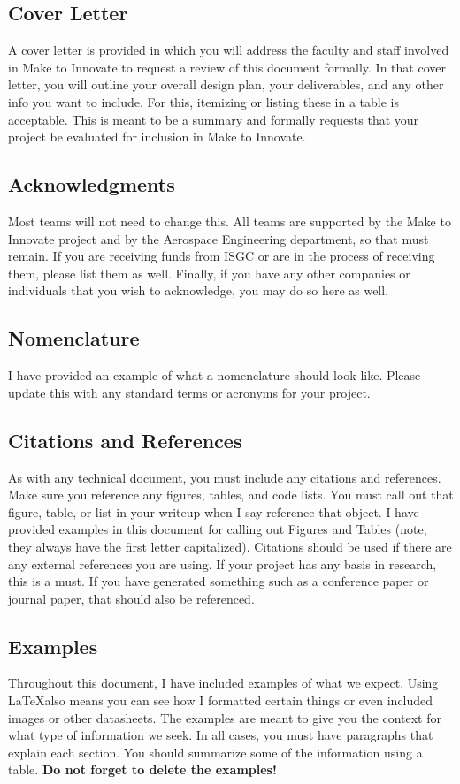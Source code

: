 \subsection{Cover Letter}
A cover letter is provided in which you will address the faculty and staff involved in Make to Innovate to request a review of this document formally. In that cover letter, you will outline your overall design plan, your deliverables, and any other info you want to include. For this, itemizing or listing these in a table is acceptable. This is meant to be a summary and formally requests that your project be evaluated for inclusion in Make to Innovate. 

\subsection{Acknowledgments}
Most teams will not need to change this. All teams are supported by the Make to Innovate project and by the Aerospace Engineering department, so that must remain. If you are receiving funds from ISGC or are in the process of receiving them, please list them as well. Finally, if you have any other companies or individuals that you wish to acknowledge, you may do so here as well.

\subsection{Nomenclature}
I have provided an example of what a nomenclature should look like. Please update this with any standard terms or acronyms for your project. 

\subsection{Citations and References}
As with any technical document, you must include any citations and references. Make sure you reference any figures, tables, and code lists. You must call out that figure, table, or list in your writeup when I say reference that object. I have provided examples in this document for calling out Figures and Tables (note, they always have the first letter capitalized). Citations should be used if there are any external references you are using. If your project has any basis in research, this is a must. If you have generated something such as a conference paper or journal paper, that should also be referenced. 

\subsection{Examples}
Throughout this document, I have included examples of what we expect. Using \LaTeX also means you can see how I formatted certain things or even included images or other datasheets. The examples are meant to give you the context for what type of information we seek. In all cases, you must have paragraphs that explain each section. You should summarize some of the information using a table. \textbf{Do not forget to delete the examples!}

